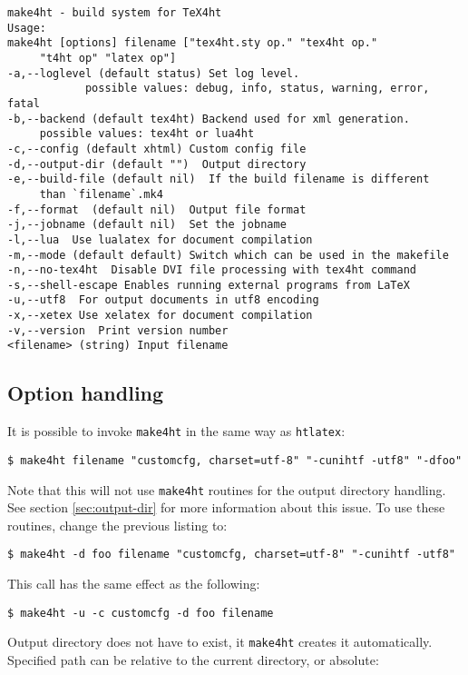 \begin{verbatim}
make4ht - build system for TeX4ht
Usage:
make4ht [options] filename ["tex4ht.sty op." "tex4ht op." 
     "t4ht op" "latex op"]
-a,--loglevel (default status) Set log level.
            possible values: debug, info, status, warning, error, fatal
-b,--backend (default tex4ht) Backend used for xml generation.
     possible values: tex4ht or lua4ht
-c,--config (default xhtml) Custom config file
-d,--output-dir (default "")  Output directory
-e,--build-file (default nil)  If the build filename is different 
     than `filename`.mk4
-f,--format  (default nil)  Output file format
-j,--jobname (default nil)  Set the jobname
-l,--lua  Use lualatex for document compilation
-m,--mode (default default) Switch which can be used in the makefile
-n,--no-tex4ht  Disable DVI file processing with tex4ht command
-s,--shell-escape Enables running external programs from LaTeX
-u,--utf8  For output documents in utf8 encoding
-x,--xetex Use xelatex for document compilation
-v,--version  Print version number
<filename> (string) Input filename
\end{verbatim}

\hypertarget{option-handling}{%
\subsection{Option handling}\label{option-handling}}

It is possible to invoke \texttt{make4ht} in the same way as
\texttt{htlatex}:

\begin{verbatim}
$ make4ht filename "customcfg, charset=utf-8" "-cunihtf -utf8" "-dfoo"
\end{verbatim}

Note that this will not use \texttt{make4ht} routines for the output
directory handling. See section \ref{sec:output-dir} for more
information about this issue. To use these routines, change the previous
listing to:

\begin{verbatim}
$ make4ht -d foo filename "customcfg, charset=utf-8" "-cunihtf -utf8"
\end{verbatim}

This call has the same effect as the following:

\begin{verbatim}
$ make4ht -u -c customcfg -d foo filename
\end{verbatim}

Output directory does not have to exist, it \texttt{make4ht} creates it
automatically. Specified path can be relative to the current directory,
or absolute:

